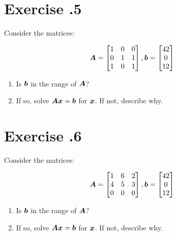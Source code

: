 \documentclass{article}
\begin{document}
\section*{Exercise \chapnumber.5}
Consider the matrices:

\begin{equation}
{\bm{A}}
=
\begin{bmatrix}
    1 & 0 & 0 \\
    0 & 1 & 1 \\
    1 & 0 & 1 
\end{bmatrix}
,
{\bm{b}}
=
\begin{bmatrix}
    42 \\
    0 \\
    12 
\end{bmatrix}
\end{equation} 

\begin{enumerate}[label=(\alph*)]

\item Is ${\bm{b}}$ in the range of ${\bm{A}}$?

\item If so, solve ${\bm{A}} {\bm{x}} = {\bm{b}}$ for ${\bm{x}}$.  If not, describe why.
\end{enumerate}

\section*{Exercise \chapnumber.6}
Consider the matrices:

\begin{equation}
{\bm{A}}
=
\begin{bmatrix}
    1 & 6 & 2 \\
    4 & 5 & 3 \\
    0 & 0 & 0
\end{bmatrix}
,
{\bm{b}}
=
\begin{bmatrix}
    42 \\
    0 \\
    12
\end{bmatrix}
\end{equation} 

\begin{enumerate}[label=(\alph*)]

\item Is ${\bm{b}}$ in the range of ${\bm{A}}$?

\item If so, solve ${\bm{A}} {\bm{x}} = {\bm{b}}$ for ${\bm{x}}$.  If not, describe why.
\end{enumerate}
\end{document}
